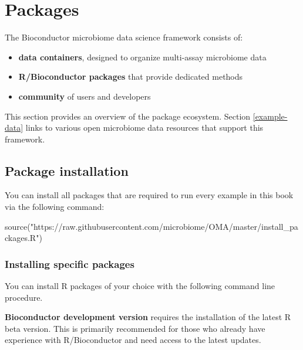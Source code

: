 \documentclass[
]{book}
\newenvironment{Shaded}{\begin{snugshade}}{\end{snugshade}}
\newcommand{\FunctionTok}[1]{\textcolor[rgb]{0.00,0.00,0.00}{#1}}
\newcommand{\NormalTok}[1]{#1}
\newcommand{\StringTok}[1]{\textcolor[rgb]{0.31,0.60,0.02}{#1}}
\providecommand{\tightlist}{%
  \setlength{\itemsep}{0pt}\setlength{\parskip}{0pt}}
\begin{document}
\hypertarget{packages}{%
\chapter{Packages}\label{packages}}

The Bioconductor microbiome data science framework consists of:

\begin{itemize}
\tightlist
\item
  \textbf{data containers}, designed to organize multi-assay microbiome data
\item
  \textbf{R/Bioconductor packages} that provide dedicated methods
\item
  \textbf{community} of users and developers
\end{itemize}

This section provides an overview of the package ecosystem. Section
\ref{example-data} links to various open microbiome data resources
that support this framework.

\hypertarget{package-installation}{%
\section{Package installation}\label{package-installation}}

You can install all packages that are required to run every example in this book via the following command:

\begin{Shaded}
\begin{Highlighting}[]
\FunctionTok{source}\NormalTok{(}\StringTok{"https://raw.githubusercontent.com/microbiome/OMA/master/install\_packages.R"}\NormalTok{)}
\end{Highlighting}
\end{Shaded}

\hypertarget{packages_specific}{%
\subsection{Installing specific packages}\label{packages_specific}}

You can install R packages of your choice with the following command
line procedure.

\textbf{Bioconductor development version} requires the installation of the
latest R beta version. This is primarily recommended for those who
already have experience with R/Bioconductor and need access to the
latest updates.
\end{document}
